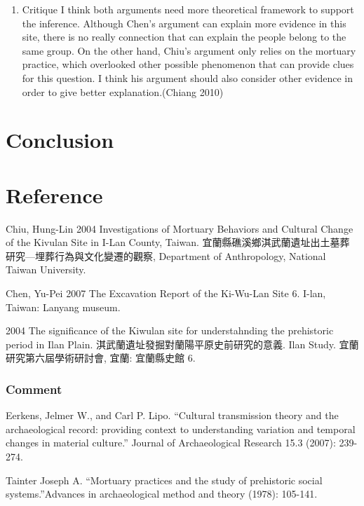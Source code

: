 \documentclass[10pt]{article}
\begin{document}
\begin{enumerate}
\def\labelenumi{\arabic{enumi}.}
\setcounter{enumi}{2}
\itemsep1pt\parskip0pt
\item
  Critique I think both arguments need more theoretical framework to
  support the inference. Although Chen's argument can explain more
  evidence in this site, there is no really connection that can explain
  the people belong to the same group. On the other hand, Chiu's
  argument only relies on the mortuary practice, which overlooked other
  possible phenomenon that can provide clues for this question. I think
  his argument should also consider other evidence in order to give
  better explanation.(Chiang 2010)
\end{enumerate}

\section*{Conclusion}\label{conclusion}

\section*{Reference}\label{reference}

Chiu, Hung-Lin 2004 Investigations of Mortuary Behaviors and Cultural
Change of the Kivulan Site in I-Lan County, Taiwan.
宜蘭縣礁溪鄉淇武蘭遺址出土墓葬研究---埋葬行為與文化變遷的觀察,
Department of Anthropology, National Taiwan University.

Chen, Yu-Pei 2007 The Excavation Report of the Ki-Wu-Lan Site 6. I-lan,
Taiwan: Lanyang museum.

2004 The significance of the Kiwulan site for understahnding the
prehistoric period in Ilan Plain.
淇武蘭遺址發掘對蘭陽平原史前研究的意義. Ilan Study.
宜蘭研究第六屆學術研討會, 宜蘭: 宜蘭縣史館 6.

\subsubsection{Comment}\label{comment}

Eerkens, Jelmer W., and Carl P. Lipo. ``Cultural transmission theory and
the archaeological record: providing context to understanding variation
and temporal changes in material culture.'' Journal of Archaeological
Research 15.3 (2007): 239-274.

Tainter Joseph A. ``Mortuary practices and the study of prehistoric
social systems.''Advances in archaeological method and theory (1978):
105-141.
\end{document}
